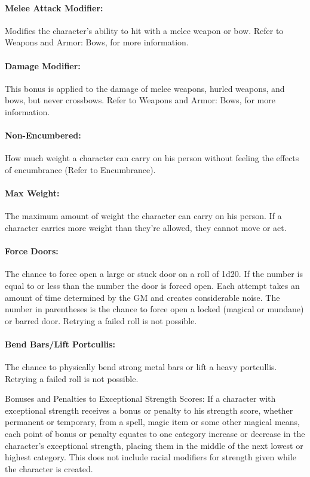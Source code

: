 \begin{multicols}{2}
\paragraph{Melee Attack Modifier:}  Modifies the character's ability to hit with a melee weapon or bow.  Refer to Weapons and Armor: Bows, for more information.

\paragraph{Damage Modifier:}  This bonus is applied to the damage of melee weapons, hurled weapons, and bows, but never crossbows.  Refer to Weapons and Armor: Bows, for more information.

\paragraph{Non-Encumbered:} How much weight a character can carry on his person without feeling the effects of encumbrance (Refer to Encumbrance).

\paragraph{Max Weight:}  The maximum amount of weight the character can carry on his person.  If a character carries more weight than they're allowed, they cannot move or act.

\paragraph{Force Doors:}  The chance to force open a large or stuck door on a roll of 1d20.  If the number is equal to or less than the number the door is forced open.  Each attempt takes an amount of time determined by the GM and creates considerable noise.  The number in parentheses is the chance to force open a locked (magical or mundane) or barred door.  Retrying a failed roll is not possible.

\paragraph{Bend Bars/Lift Portcullis:}  The chance to physically bend strong metal bars or lift a heavy portcullis.  Retrying a failed roll is not possible.

Bonuses and Penalties to Exceptional Strength Scores: If a character with exceptional strength receives a bonus or penalty to his strength score, whether permanent or temporary, from a spell, magic item or some other magical means, each point of bonus or penalty equates to one category increase or decrease in the character's exceptional strength, placing them in the middle of the next lowest or highest category.  This does not include racial modifiers for strength given while the character is created.


\end{multicols}
